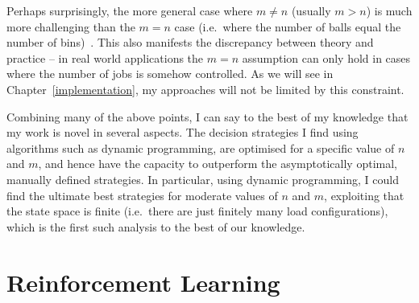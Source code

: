 \begin{itemize}
    Perhaps surprisingly, the more general case where $m\neq n$ (usually $m>n$) is much more challenging than the $m=n$ case (i.e.\ where the number of balls equal the number of bins)~\cite{berenbrink2006heavilyloaded}. This also manifests the discrepancy between theory and practice -- in real world applications the $m=n$ assumption can only hold in cases where the number of jobs is somehow controlled. As we will see in Chapter~\ref{implementation}, my approaches will not be limited by this constraint.

\end{itemize}

Combining many of the above points, I can say to the best of my knowledge that my work is novel in several aspects. The decision strategies I find using algorithms such as dynamic programming, are optimised for a specific value of $n$ and $m$, and hence have the capacity to outperform the asymptotically optimal, manually defined strategies. In particular, using dynamic programming, I could find the ultimate best strategies for moderate values of $n$ and $m$, exploiting that the state space is finite (i.e.\ there are just finitely many load configurations), which is the first such analysis to the best of our knowledge.


\section{Reinforcement Learning} \label{RLintro}


